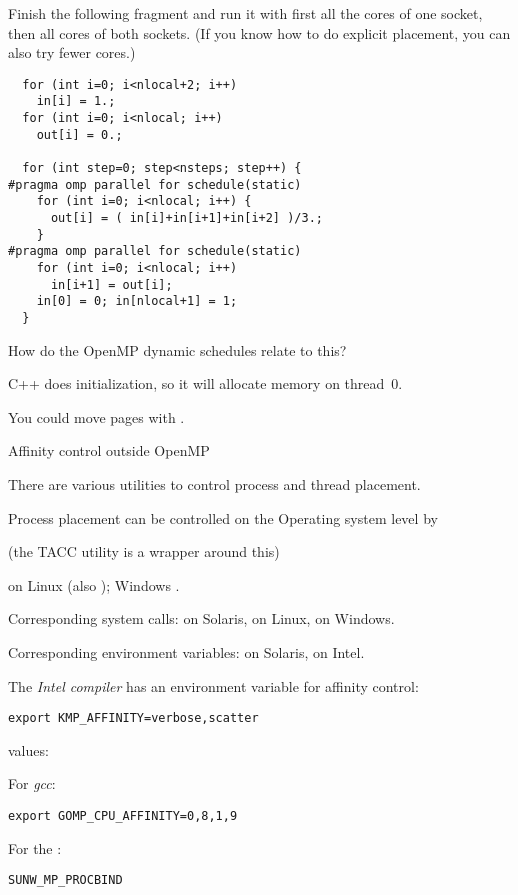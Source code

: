 \begin{exercise}
  \label{ex:first-touch}
  Finish the following fragment and run it with first all the cores of
  one socket, then all cores of both sockets. (If you know how to do
  explicit placement, you can also try fewer cores.)
\begin{verbatim}
  for (int i=0; i<nlocal+2; i++)
    in[i] = 1.;
  for (int i=0; i<nlocal; i++)
    out[i] = 0.;

  for (int step=0; step<nsteps; step++) {
#pragma omp parallel for schedule(static)
    for (int i=0; i<nlocal; i++) {
      out[i] = ( in[i]+in[i+1]+in[i+2] )/3.;
    }
#pragma omp parallel for schedule(static)
    for (int i=0; i<nlocal; i++)
      in[i+1] = out[i];
    in[0] = 0; in[nlocal+1] = 1;
  }
\end{verbatim}
\end{exercise}

\begin{exercise}
  How do the OpenMP dynamic schedules relate to this?
\end{exercise}

C++  does initialization, so it will allocate
memory on thread~0.

You could move pages with .

 {Affinity control outside OpenMP}

There are various utilities to control process and thread placement.

Process placement can be controlled on the Operating system level by
\begin{tacc}
(the TACC utility  is a wrapper around this)
\end{tacc}
on Linux (also ); Windows
.

Corresponding system calls:  on Solaris,
 on Linux,
 on Windows.

Corresponding environment variables:  on
Solaris,  on Intel.

The \emph{Intel compiler} has an
environment variable for affinity control:
\begin{verbatim}
export KMP_AFFINITY=verbose,scatter
\end{verbatim}
values: 

For \emph{gcc}:
\begin{verbatim}
export GOMP_CPU_AFFINITY=0,8,1,9
\end{verbatim}

For the :
\begin{verbatim}
SUNW_MP_PROCBIND
\end{verbatim}

